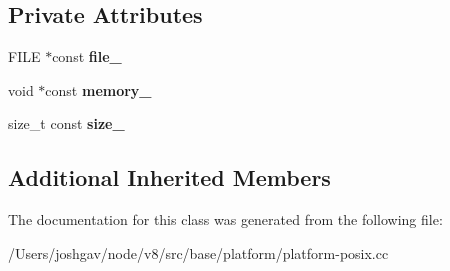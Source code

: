 \subsection*{Private Attributes}
\begin{DoxyCompactItemize}
\item 
F\+I\+LE $\ast$const {\bfseries file\+\_\+}\hypertarget{classv8_1_1base_1_1_posix_memory_mapped_file_a9e150568322b55f1a0f87aad794c9421}{}\label{classv8_1_1base_1_1_posix_memory_mapped_file_a9e150568322b55f1a0f87aad794c9421}

\item 
void $\ast$const {\bfseries memory\+\_\+}\hypertarget{classv8_1_1base_1_1_posix_memory_mapped_file_a157673ca693729c326118e629de5c728}{}\label{classv8_1_1base_1_1_posix_memory_mapped_file_a157673ca693729c326118e629de5c728}

\item 
size\+\_\+t const {\bfseries size\+\_\+}\hypertarget{classv8_1_1base_1_1_posix_memory_mapped_file_a153b1fcd6ebe8d134648136861b3a619}{}\label{classv8_1_1base_1_1_posix_memory_mapped_file_a153b1fcd6ebe8d134648136861b3a619}

\end{DoxyCompactItemize}
\subsection*{Additional Inherited Members}


The documentation for this class was generated from the following file\+:\begin{DoxyCompactItemize}
\item 
/\+Users/joshgav/node/v8/src/base/platform/platform-\/posix.\+cc\end{DoxyCompactItemize}
